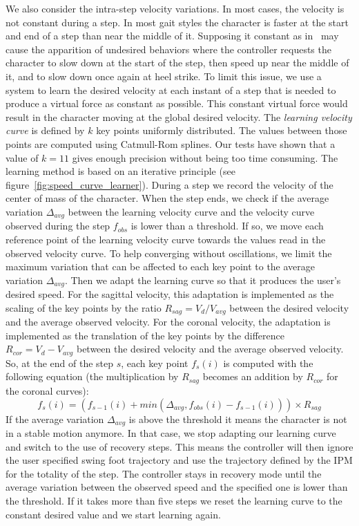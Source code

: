 \documentclass[conference]{acmsiggraph}
\begin{document}
We also consider the intra-step velocity variations. In most cases, the velocity is not constant during a step. In most gait styles the character is faster at the start and end of a step than near the middle of it. Supposing it constant as in~\cite{coros2010generalized} may cause the apparition of undesired behaviors where the controller requests the character to slow down at the start of the step, then speed up near the middle of it, and to slow down once again at heel strike. To limit this issue, we use a system to learn the desired velocity at each instant of a step that is needed to produce a virtual force as constant as possible. This constant virtual force would result in the character moving at the global desired velocity. The \textit{learning velocity curve} is defined by $k$ key points uniformly distributed. The values between those points are computed using Catmull-Rom splines. Our tests have shown that a value of $k=11$ gives enough precision without being too time consuming.
The learning method is based on an iterative principle (see figure~\ref{fig:speed_curve_learner}). During a step we record the velocity of the center of mass of the character. When the step ends, we check if the average variation $\Delta_{avg}$ between the learning velocity curve and the velocity curve observed during the step $f_{obs}$ is lower than a threshold. If so, we move each reference point of the learning velocity curve towards the values read in the observed velocity curve. To help converging without oscillations, we limit the maximum variation that can be affected to each key point to the average variation $\Delta_{avg}$. Then we adapt the learning curve so that it produces the user's desired speed. For the sagittal velocity, this adaptation is implemented as the scaling of the key points by the ratio $R_{sag}=V_d/V_{avg}$ between the desired velocity and the average observed velocity. For the coronal velocity, the adaptation is implemented as the translation of the key points by the difference $R_{cor}=V_d - V_{avg}$ between the desired velocity and the average observed velocity. So, at the end of the step $s$, each key point $f_s(i)$ is computed with the following equation  (the multiplication by $R_{sag}$ becomes an addition by $R_{cor}$ for the coronal curves):
\begin{equation}
f_s(i)= (f_{s-1}(i) + min(\Delta_{avg},f_{obs}(i)- f_{s-1}(i))) \times R_{sag}
\end{equation}
If the average variation $\Delta_{avg}$ is above the threshold it means the character is not in a stable motion anymore.
In that case, we stop adapting our learning curve and switch to the use of recovery steps. This means the controller will then ignore the user specified swing foot trajectory and use the trajectory defined by the IPM for the totality of the step. The controller stays in recovery mode until the average variation between the observed speed and the specified one is lower than the threshold. If it takes more than five steps we reset the learning curve to the constant desired value and we start learning again. 
\end{document}
